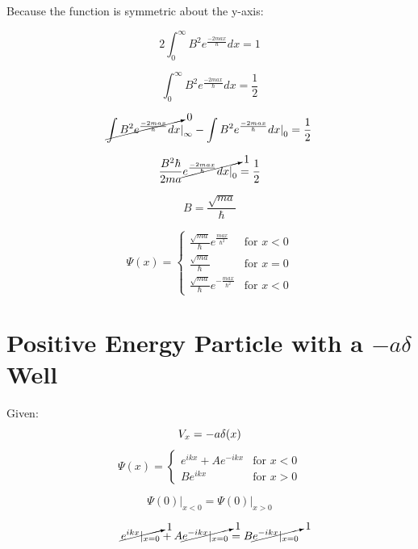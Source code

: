 \documentclass[12pt]{article}
\begin{document}
Because the function is symmetric about the y-axis:


\begin{equation}
  2\int_{0}^{\infty} B^2e^{\frac{-2max}{\hbar}} dx = 1
\end{equation}

\begin{equation}
  \int_{0}^{\infty} B^2e^{\frac{-2max}{\hbar}} dx = \frac{1}{2}
\end{equation}

\begin{equation}
  \cancelto{0}{\int B^2e^{\frac{-2max}{\hbar}}dx}{\rvert}_\infty - {\int B^2e^{\frac{-2max}{\hbar}}dx}{\rvert}_0  = \frac{1}{2}
\end{equation}

\begin{equation}
  \frac{B^2\hbar}{2ma}\cancelto{1}{e^{\frac{-2max}{\hbar}}dx{\rvert}_0}  = \frac{1}{2}
\end{equation}

\begin{equation}
  B=\frac{\sqrt{ma}}{\hbar}
\end{equation}

\begin{equation}
\boxed{
  \Psi(x)=
    \begin{cases}
      \frac{\sqrt{ma}}{\hbar}e^{\frac{max}{\hbar^2}} &\mbox{for } x<0 \\
      \frac{\sqrt{ma}}{\hbar} &\mbox{for } x=0 \\
      \frac{\sqrt{ma}}{\hbar}e^{-\frac{max}{\hbar^2}} &\mbox{for } x<0
    \end{cases}
  }
\end{equation}


\section{Positive Energy Particle with a $-a\delta$ Well}

Given:
\[
  V_x=-a\delta(x)\\
\]
\[
  \Psi(x)=
  \begin{cases}
    e^{ikx}+Ae^{-ikx} &\mbox{for } x<0\\
    Be^{ikx} &\mbox{for } x>0
  \end{cases}
\]

\begin{equation}
  \Psi(0)\rvert_{x<0}=\Psi(0)\rvert_{x>0}
\end{equation}

\begin{equation}
    \cancelto{1}{e^{ikx}\rvert_{x=0}} + A\cancelto{1}{e^{-ikx}\rvert_{x=0}} =B\cancelto{1}{e^{-ikx}\rvert_{x=0}} 
\end{equation}
\end{document}
